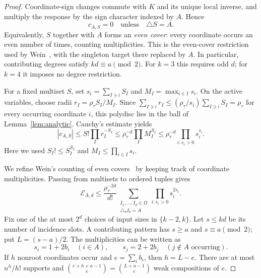 \documentclass[11pt]{article}
\begin{document}
\begin{proof}
Coordinate-sign changes commute with \(K\) and its unique local inverse, and multiply the response by the sign character indexed by \(A\).
Hence
\begin{equation}\label{eq:parity}
c_{A,S}=0\quad\text{unless}\quad\triangle S=A.
\end{equation}
Equivalently, \(S\) together with \(A\) forms an \emph{even cover}: every coordinate occurs an even number of times, counting multiplicities.
This is the even-cover restriction used by Wein~\cite[Lemma~3.16]{Wein2023}, with the singleton target there replaced by \(A\).
In particular, contributing degrees satisfy \(kd\equiv a\pmod2\).
For \(k=3\) this requires odd \(d\); for \(k=4\) it imposes no degree restriction.

For a fixed multiset \(S\), set \(s_i=\sum_{I\ni i}S_I\) and \(M_I=\max_{i\in I}s_i\).
On the active variables, choose radii \(r_I=\rho_\tau S_I/M_I\).
Since
\(\sum_{I\ni i}r_I\le(\rho_\tau/s_i)\sum_{I\ni i}S_I=\rho_\tau\)
for every occurring coordinate \(i\), this polydisc lies in the ball of Lemma~\ref{lem:analytic}.
Cauchy's estimate yields
\begin{equation}\label{eq:cauchy}
|c_{A,S}|
\le S!\prod_I r_I^{-S_I}
\le\rho_\tau^{-d}\prod_I M_I^{S_I}
\le\rho_\tau^{-d}\prod_{i:s_i>0}s_i^{s_i}.
\end{equation}
Here we used \(S_I!\le S_I^{S_I}\) and \(M_I\le\prod_{i\in I}s_i\).

We refine Wein's counting of even covers~\cite[Lemma~3.17]{Wein2023} by keeping track of coordinate multiplicities.
Passing from multisets to ordered tuples gives
\begin{equation}\label{eq:ordered-count}
\mathcal E_{A,d}
\le\frac{\rho_\tau^{-2d}}{d!}
\sum_{\substack{I_1,\ldots,I_d\in\Omega\\\triangle_b I_b=A}}
\prod_{i:s_i>0}s_i^{2s_i}.
\end{equation}
Fix one of the at most \(2^d\) choices of input sizes in \(\{k-2,k\}\).
Let \(s\le kd\) be its number of incidence slots.
A contributing pattern has \(s\ge a\) and \(s\equiv a\pmod2\); put \(L=(s-a)/2\).
The multiplicities can be written as
\[
s_i=1+2b_i\quad(i\in A),\qquad
s_j=2+2b_j\quad(j\notin A\text{ occurring}).
\]
If \(h\) nonroot coordinates occur and \(e=\sum_i b_i\), then \(h=L-e\).
There are at most \(n^h/h!\) supports and
\(\binom{e+h+a-1}{e}=\binom{L+a-1}{e}\)
weak compositions of \(e\).


\end{proof}
\end{document}
